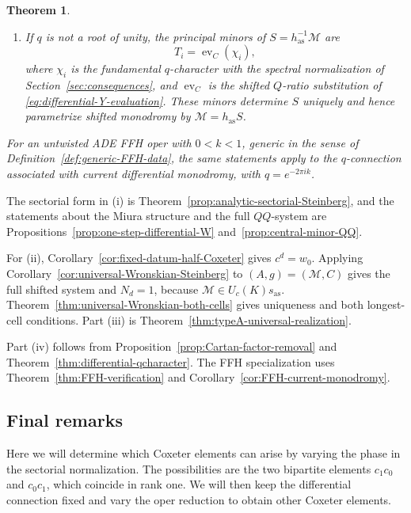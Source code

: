 \documentclass[11pt,leqno]{amsart}
\numberwithin{equation}{section}
\theoremstyle{plain}
\newtheorem{theorem}{Theorem}[section]
\theoremstyle{definition}
\theoremstyle{plain}
\theoremstyle{definition}
\theoremstyle{remark}
\begin{document}
\begin{theorem}
\begin{enumerate}[label=(\roman*),topsep=3pt,itemsep=5pt]
\item If $q$ is not a root of unity, the principal minors of $S=h_{\mathrm{as}}^{-1}\mathscr M$ are
\[
 T_i=\operatorname{ev}_C(\chi_i),
\]
where $\chi_i$ is the fundamental $q$-character with the spectral normalization of Section~\ref{sec:consequences}, and $\operatorname{ev}_C$ is the shifted $Q$-ratio substitution of \eqref{eq:differential-Y-evaluation}. These minors determine $S$ uniquely and hence parametrize shifted monodromy by $\mathscr M=h_{\mathrm{as}}S$.
\end{enumerate}
For an untwisted ADE FFH oper with $0<k<1$, generic in the sense of Definition~\ref{def:generic-FFH-data}, the same statements apply to the $q$-connection associated with current differential monodromy, with $q=e^{-2\pi ik}$.
\end{theorem}

The sectorial form in (i) is Theorem~\ref{prop:analytic-sectorial-Steinberg}, and the statements about the Miura structure and the full $QQ$-system are Propositions~\ref{prop:one-step-differential-W} and~\ref{prop:central-minor-QQ}.

For (ii), Corollary~\ref{cor:fixed-datum-half-Coxeter} gives $c^d=w_0$. Applying Corollary~\ref{cor:universal-Wronskian-Steinberg} to $(A,g)=(\mathscr M,C)$ gives the full shifted system and $N_d=1$, because $\mathscr M\in U_c(K)s_{\mathrm{as}}$. Theorem~\ref{thm:universal-Wronskian-both-cells} gives uniqueness and both longest-cell conditions. Part (iii) is Theorem~\ref{thm:typeA-universal-realization}.

Part (iv) follows from Proposition~\ref{prop:Cartan-factor-removal} and Theorem~\ref{thm:differential-qcharacter}. The FFH specialization uses Theorem~\ref{thm:FFH-verification} and Corollary~\ref{cor:FFH-current-monodromy}.

\subsection{Final remarks}\label{sec:final-remarks}

Here we will determine which Coxeter elements can arise by varying the phase in the sectorial normalization. The possibilities are the two bipartite elements $c_1c_0$ and $c_0c_1$, which coincide in rank one. We will then keep the differential connection fixed and vary the oper reduction to obtain other Coxeter elements.
\end{document}
